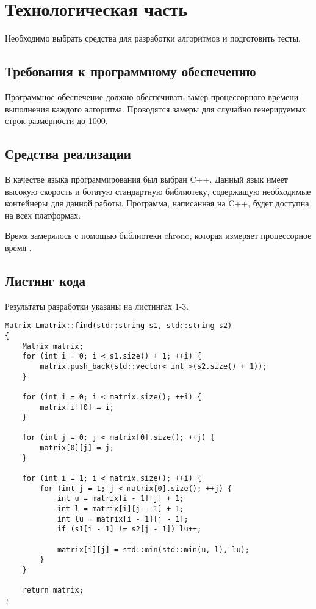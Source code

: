 \newpage
\section{Технологическая часть}

Необходимо выбрать средства для разработки алгоритмов и подготовить
тесты.

\subsection{Требования к программному обеспечению}

Программное обеспечение должно обеспечивать замер процессорного времени
выполнения каждого алгоритма. Проводятся замеры для случайно генерируемых
строк размерности до 1000.

\subsection{Средства реализации}

В качестве языка программирования был выбран C++.
Данный язык имеет высокую скорость и богатую стандартную библиотеку,
содержащую необходимые контейнеры для данной работы. Программа, написанная на C++,
будет доступна на всех платформах.

Время замерялось с помощью библиотеки chrono, которая измеряет процессорное время \cite{chrono}.

\subsection{Листинг кода}

Результаты разработки указаны на листингах 1-3.

\begin{lstlisting}[caption=Расстояние Левенштейна матричный метод]
Matrix Lmatrix::find(std::string s1, std::string s2)
{
    Matrix matrix;
    for (int i = 0; i < s1.size() + 1; ++i) {
        matrix.push_back(std::vector< int >(s2.size() + 1));
    }

    for (int i = 0; i < matrix.size(); ++i) {
        matrix[i][0] = i;
    }

    for (int j = 0; j < matrix[0].size(); ++j) {
        matrix[0][j] = j;
    }

    for (int i = 1; i < matrix.size(); ++i) {
        for (int j = 1; j < matrix[0].size(); ++j) {
            int u = matrix[i - 1][j] + 1;
            int l = matrix[i][j - 1] + 1;
            int lu = matrix[i - 1][j - 1];
            if (s1[i - 1] != s2[j - 1]) lu++;

            matrix[i][j] = std::min(std::min(u, l), lu);
        }
    }

    return matrix;
}
\end{lstlisting}

